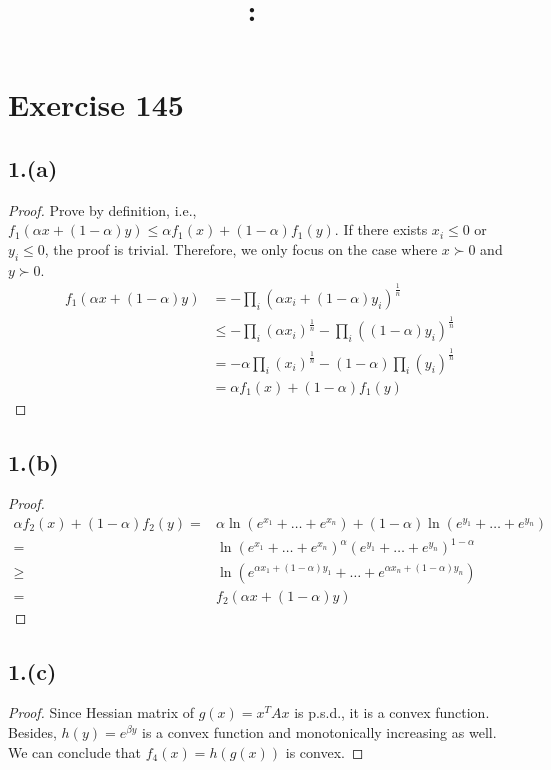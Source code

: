 \documentclass{article}
\date{}
\title{
    \textmd{\textbf{\hmwkClass:\ \hmwkTitle}}\\
}
\author{\hmwkAuthorName}
\begin{document}
\maketitle
\section{Exercise 145}
\subsection{1.(a)}
\begin{proof}
Prove by definition, i.e., $f_1(\alpha x + (1-\alpha) y) \leq \alpha f_1(x) + (1-\alpha)f_1(y)$.
If there exists $x_i \leq 0$ or $y_i \leq 0$, the proof is trivial. Therefore, we only focus on the case where $x \succ 0$ and $y \succ 0$.
\begin{align*}
f_1(\alpha x + (1 - \alpha) y) & = -\prod_i (\alpha x_{i} + (1 - \alpha) y_{i})^{\frac{1}{n}} \\
&\leq - \prod_i (\alpha x_i)^{\frac{1}{n}} - \prod_i ((1-\alpha) y_i)^{\frac{1}{n}}\\
&= -\alpha \prod_i ( x_i)^{\frac{1}{n}} - (1-\alpha)\prod_i ( y_i)^{\frac{1}{n}}\\
&= \alpha f_1(x) + (1-\alpha)f_1(y)
\end{align*}
\end{proof}

\subsection{1.(b)}
\begin{proof}

\begin{align*}
\alpha f_2(x) + (1 - \alpha) f_2(y) = & \alpha \ln(e^{x_{1}} + \ldots + e^{x_{n}}) + (1 - \alpha) \ln(e^{y_{1}} + \ldots + e^{y_{n}}) \\
= & \ln (e^{x_{1}} + \ldots + e^{x_{n}})^\alpha (e^{y_{1}} + \ldots + e^{y_{n}})^{1 - \alpha} \\
\ge & \ln(e^{\alpha x_{1} + (1 - \alpha) y_{1}} + \ldots + e^{\alpha x_{n} + (1 - \alpha) y_{n}}) \\
= & f_2(\alpha x + (1 - \alpha) y)
\end{align*}
\end{proof}

\subsection{1.(c)}
\begin{proof}
Since Hessian matrix of $g(x) = x^TAx$ is p.s.d., it is a convex function. Besides, $h(y) = e^{\beta y}$ is a convex function and monotonically increasing as well. We can conclude that $f_4(x) = h(g(x))$ is convex.
\end{proof}
\end{document}
